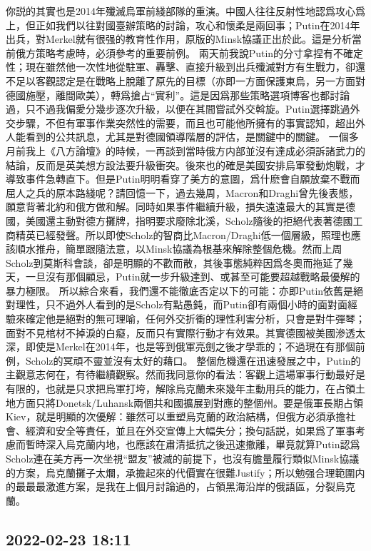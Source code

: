 \documentclass[twocolumn]{ctexart}
\begin{document}
你説的其實也是2014年殲滅烏軍前綫部隊的重演。中國人往往反射性地認爲攻心爲上，但正如我們以往對國臺辦策略的討論，攻心和懷柔是兩回事；Putin在2014年出兵，對Merkel就有很强的教育性作用，原版的Minsk協議正出於此。這是分析當前俄方策略考慮時，必須參考的重要前例。
兩天前我說Putin的分寸拿捏有不確定性；現在雖然他一次性地從駐軍、轟擊、直接升級到出兵殲滅對方有生戰力，卻還不足以客觀認定是在戰略上脫離了原先的目標（亦即一方面保護東烏，另一方面對德國施壓，離間歐美），轉爲搶占“實利”。這是因爲那些策略選項博客也都討論過，只不過我偏愛分幾步逐次升級，以便在其間嘗試外交斡旋。Putin選擇跳過外交步驟，不但有軍事作業突然性的需要，而且也可能他所擁有的事實認知，超出外人能看到的公共訊息，尤其是對德國領導階層的評估，是關鍵中的關鍵。
一個多月前我上《八方論壇》的時候，一再談到當時俄方内部並沒有達成必須訴諸武力的結論，反而是英美想方設法要升級衝突。後來也的確是美國安排烏軍發動炮戰，才導致事件急轉直下。但是Putin明明看穿了美方的意圖，爲什麽會自願放棄不戰而屈人之兵的原本路綫呢？請回憶一下，過去幾周，Macron和Draghi曾先後表態，願意背著北約和俄方做和解。同時如果事件繼續升級，損失遠遠最大的其實是德國，美國還主動對德方攤牌，指明要求廢除北溪，Scholz隨後的拒絕代表著德國工商精英已經發聲。所以即使Scholz的智商比Macron/Draghi低一個層級，照理也應該順水推舟，簡單跟隨法意，以Minsk協議為根基來解除整個危機。然而上周Scholz到莫斯科會談，卻是明顯的不歡而散，其後事態純粹因爲冬奧而拖延了幾天，一旦沒有那個顧忌，Putin就一步升級達到、或甚至可能要超越戰略最優解的暴力極限。
所以綜合來看，我們還不能徹底否定以下的可能：亦即Putin依舊是絕對理性，只不過外人看到的是Scholz有點愚鈍，而Putin卻有兩個小時的面對面經驗來確定他是絕對的無可理喻，任何外交折衝的理性利害分析，只會是對牛彈琴；面對不見棺材不掉淚的白癡，反而只有實際行動才有效果。其實德國被美國滲透太深，即使是Merkel在2014年，也是等到俄軍亮劍之後才學乖的；不過現在有那個前例，Scholz的冥頑不靈並沒有太好的藉口。
整個危機還在迅速發展之中，Putin的主觀意志何在，有待繼續觀察。然而我同意你的看法：客觀上這場軍事行動最好是有限的，也就是只求把烏軍打垮，解除烏克蘭未來幾年主動用兵的能力，在占領土地方面只將Donetsk/Luhansk兩個共和國擴展到對應的整個州。要是俄軍長期占領Kiev，就是明顯的次優解：雖然可以重塑烏克蘭的政治結構，但俄方必須承擔社會、經濟和安全等責任，並且在外交宣傳上大幅失分；換句話説，如果爲了軍事考慮而暫時深入烏克蘭内地，也應該在肅清抵抗之後迅速撤離，畢竟就算Putin認爲Scholz連在美方再一次坐視“盟友”被滅的前提下，也沒有膽量履行類似Minsk協議的方案，烏克蘭攤子太爛，承擔起來的代價實在很難Justify；所以勉强合理範圍内的最最最激進方案，是我在上個月討論過的，占領黑海沿岸的俄語區，分裂烏克蘭。
\subsection*{2022-02-23 18:11}
\end{document}
